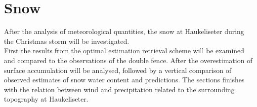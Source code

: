 \section{Snow}
After the analysis of meteorological quantities, the snow at Haukeliseter during the Christmas storm will be investigated.
\\
First the results from the optimal estimation retrieval scheme will be examined and compared to the observations of the double fence. After the overestimation of surface accumulation will be analysed, followed by a vertical comparison of observed estimates of snow water content and predictions. The sections finishes with the relation between wind and precipitation related to the surrounding topography at Haukeliseter. 

